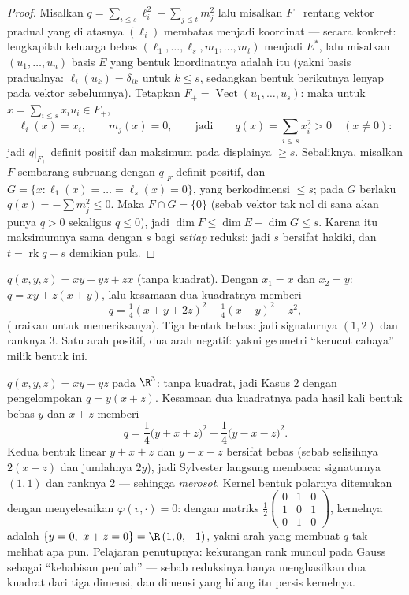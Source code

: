 \begin{proof}
Misalkan $q = \sum_{i \leq s}\ell_i^2 - \sum_{j\leq t} m_j^2$ lalu misalkan
$F_+$ rentang vektor pradual yang di atasnya $(\ell_i)$
membatas menjadi koordinat --- secara konkret: lengkapilah keluarga
bebas $(\ell_1, \dots, \ell_s, m_1, \dots, m_t)$
menjadi  $E^*$, lalu misalkan $(u_1, \dots, u_n)$
basis $E$ yang bentuk koordinatnya adalah itu (yakni basis
pradualnya: $\ell_i(u_k) = \delta_{ik}$ untuk $k \leq s$,
sedangkan bentuk berikutnya lenyap pada vektor sebelumnya). Tetapkan $F_+ =
\operatorname{Vect}(u_1, \dots, u_s)$: maka untuk $x = \sum_{i\leq
s}x_iu_i \in F_+$,
\[
\ell_i(x) = x_i,
\qquad m_j(x) = 0,
\qquad\text{jadi}\qquad
q(x) = \sum_{i\leq s}x_i^2 > 0 \quad (x \neq 0) :
\]
jadi $q|_{F_+}$ definit positif dan maksimum pada displainya
$\geq s$. Sebaliknya, misalkan $F$ sembarang subruang dengan $q|_F$
definit positif, dan $G = \{x : \ell_1(x) = \dots = \ell_s(x) =
0\}$, yang berkodimensi $\leq s$; pada $G$ berlaku $q(x) = -\sum m_j^2 \leq 0$.
Maka $F \cap G = \{0\}$ (sebab vektor tak nol di sana akan punya $q > 0$
sekaligus $q \leq 0$), jadi $\dim F \leq \dim E - \dim G \leq s$. Karena itu
maksimumnya sama dengan $s$ bagi \emph{setiap} reduksi: jadi $s$ bersifat
hakiki, dan $t = \operatorname{rk} q - s$ demikian pula.
\end{proof}

\begin{example}\label{ex:b2:quadratic:gaussexample}
$q(x, y, z) = xy + yz + zx$ (tanpa kuadrat). Dengan $x_1 = x$ dan $x_2 =
y$: $q = xy + z(x + y)$, lalu kesamaan dua kuadratnya memberi
\[
q = \tfrac14(x + y + 2z)^2 - \tfrac14(x - y)^2 - z^2 ,
\]
(uraikan untuk memeriksanya). Tiga bentuk bebas: jadi signaturnya $(1, 2)$
dan ranknya $3$. Satu arah positif, dua arah negatif: yakni geometri
``kerucut cahaya'' milik bentuk ini.
\end{example}

\begin{example}\label{ex:b2:quadratic:degenerate}
$q(x, y, z) = xy + yz$ pada $\R^3$: tanpa kuadrat, jadi Kasus 2 dengan
pengelompokan $q = y(x + z)$. Kesamaan dua kuadratnya pada hasil kali
bentuk bebas $y$ dan $x + z$ memberi
\[
q = \frac14\bigl(y + x + z\bigr)^2 -
\frac14\bigl(y - x - z\bigr)^2 .
\]
Kedua bentuk linear $y + x + z$ dan $y - x - z$ bersifat
bebas (sebab selisihnya $2(x+z)$ dan jumlahnya $2y$), jadi
Sylvester langsung membaca: signaturnya $(1, 1)$ dan ranknya $2$ ---
sehingga \emph{merosot}. Kernel bentuk polarnya ditemukan dengan
menyelesaikan $\varphi(v, \cdot) = 0$: dengan matriks
$\frac12\begin{pmatrix} 0&1&0\\ 1&0&1\\ 0&1&0\end{pmatrix}$,
kernelnya adalah $\{y = 0,\ x + z = 0\} = \R\,(1, 0, -1)$, yakni
arah yang membuat $q$ tak melihat apa pun. Pelajaran penutupnya:
kekurangan rank muncul pada Gauss sebagai ``kehabisan peubah''
--- sebab reduksinya hanya menghasilkan dua kuadrat dari tiga
dimensi, dan dimensi yang hilang itu persis kernelnya.
\end{example}

